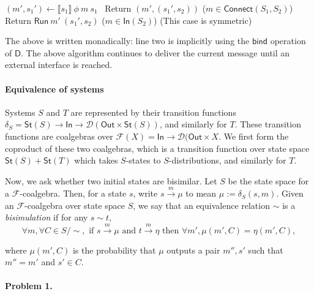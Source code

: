 \documentclass{article}
\begin{document}
\begin{algorithm}
\begin{algorithmic}[1]
        \State $(m', s_1') \leftarrow \llbracket s_1 \rrbracket\ \phi\ m\ s_1$
         \
            \State Return $(m', (s_1', s_2))$
        \Else 
            \State ($m \in \textsf{Connect}(S_1, S_2)$) 
            \State Return $\textsf{Run}\ m'\ (s_1', s_2)$
        \EndIf
    \Else
        \State ($m \in \textsf{In}(S_2)$)
        \State (This case is symmetric)
    \EndIf
\end{algorithmic}
\end{algorithm}

The above is written monadically: line two is implicitly using the $\textsf{bind}$ operation of $\textsf{D}$. The above algorithm continues to deliver the current message until an external interface is reached.


\paragraph{Equivalence of systems}

Systems $S$ and $T$ are represented by their transition functions $\delta_S = \textsf{St}(S) \to \textsf{In} \to \mathcal{D} (\textsf{Out} \times \textsf{St}(S))$, and similarly for $T$. These transition functions are coalgebras over $\mathcal{F}(X) = \textsf{In} \to \mathcal{D} (\textsf{Out} \times X$. We first form the coproduct of these two coalgebras, which is a transition function over state space $\textsf{St}(S) + \textsf{St}(T)$ which takes $S$-states to $S$-distributions, and similarly for $T$.

Now, we ask whether two initial states are bisimilar. 
Let $S$ be the state space for a $\mathcal{F}$-coalgebra. Then, for a state $s$, write $s \xrightarrow{m} \mu$ to mean $\mu := \delta_S (s,m)$.
Given an $\mathcal{F}$-coalgebra over state space $S$, we say that an equivalence relation $\sim$ is a \emph{bisimulation} if for any $s \sim t$,
\[ \forall m, \forall C \in S / \sim, \text{ if } s \xrightarrow{m} \mu \text{ and } t \xrightarrow{m} \eta \text{ then }  \forall m', \mu(m',C) = \eta(m',C),\]

where $\mu(m',C)$ is the probability that $\mu$ outputs a pair $m'', s'$ such that $m'' = m'$ and $s' \in C$.

\paragraph{Problem 1.}
\end{document}
